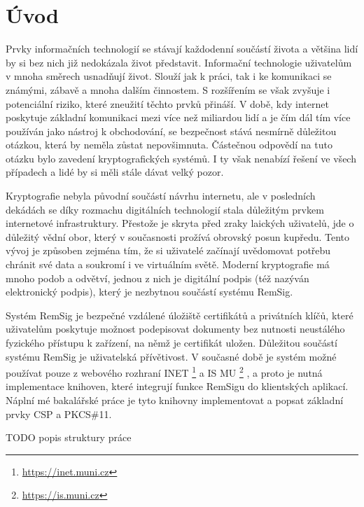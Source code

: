 \documentclass[]{fithesis3}
\begin{document}
\chapter{Úvod}

Prvky informačních technologií se stávají každodenní součástí života a většina lidí by si bez nich již nedokázala život představit. Informační technologie uživatelům v mnoha směrech usnadňují život. Slouží jak k práci, tak i ke komunikaci se známými, zábavě a mnoha dalším činnostem. S rozšířením se však zvyšuje i potenciální riziko, které zneužití těchto prvků přináší. V době, kdy internet poskytuje základní komunikaci mezi více než miliardou lidí a je čím dál tím více používán jako nástroj k obchodování, se bezpečnost stává nesmírně důležitou otázkou, která by neměla zůstat nepovšimnuta. Částečnou odpovědí na tuto otázku bylo zavedení kryptografických systémů. I ty však nenabízí řešení ve všech případech a lidé by si měli stále dávat velký pozor. 

Kryptografie nebyla původní součástí návrhu internetu, ale v posledních dekádách se díky rozmachu digitálních technologií stala důležitým prvkem internetové infrastruktury. Přestože je skryta před zraky laických uživatelů, jde o důležitý vědní obor, který v současnosti prožívá obrovský posun kupředu. Tento vývoj je způsoben zejména tím, že si uživatelé začínají uvědomovat potřebu chránit své data a soukromí i ve virtuálním světě. Moderní kryptografie má mnoho podob a odvětví, jednou z nich je digitální podpis (též nazýván elektronický podpis), který je nezbytnou součástí systému RemSig.

Systém RemSig je bezpečné vzdálené úložiště certifikátů a privátních klíčů, které uživatelům poskytuje možnost podepisovat dokumenty bez nutnosti neustálého fyzického přístupu k zařízení, na němž je certifikát uložen. Důležitou součástí systému RemSig je uživatelská přívětivost. V současné době je systém možné používat pouze z webového rozhraní INET
\footnote{\url{https://inet.muni.cz}} 
a IS MU
\footnote{\url{https://is.muni.cz}}
, a proto je nutná implementace knihoven, které integrují funkce RemSigu do klientských aplikací. Náplní mé bakalářské práce je tyto knihovny implementovat a popsat základní prvky CSP a PKCS\#11. 


TODO popis struktury práce
\end{document}
